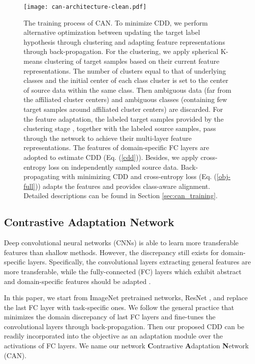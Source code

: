 \documentclass[10pt,twocolumn,letterpaper]{article}
\begin{document}
\begin{figure*}[t]
\begin{center}
\texttt{[image: can-architecture-clean.pdf]}
\end{center}
\vspace{-3mm}
\caption{\label{fig:framework}
The training process of CAN. To minimize CDD, we perform alternative optimization 
between updating the target label hypothesis through clustering and 
adapting feature representations through back-propagation. 
For the clustering, we apply spherical K-means clustering of target samples
based on their current feature representations.
The number of clusters equal to that of underlying classes and 
the initial center of each class cluster is set to the center of source data
within the same class.
Then ambiguous data (\ie far from the affiliated cluster centers) and 
ambiguous classes (\ie containing few target samples around affiliated cluster centers) 
are discarded.
For the feature adaptation, the labeled target samples provided by the clustering stage
, together with the labeled source samples, pass through the network
to achieve their multi-layer feature representations. 
The features of domain-specific FC layers are adopted to estimate CDD (Eq. (\ref{cdd})).
Besides, we apply cross-entropy loss on independently sampled source data.
Back-propagating with minimizing CDD and cross-entropy loss (Eq. (\ref{obj-full})) adapts the
features and provides class-aware alignment.
Detailed descriptions can be found in Section \ref{sec:can_training}.}
\vspace{-3mm}
\end{figure*}
\subsection{Contrastive Adaptation Network}\label{sec:can}
Deep convolutional neural networks (CNNs) is able to learn more transferable features than shallow methods. 
However, the discrepancy still exists for domain-specific layers.
Specifically, the convolutional layers extracting general features are more transferable, 
while the fully-connected (FC) layers which exhibit abstract and domain-specific features should be adapted \cite{long2015learning,long2017deep}. 

In this paper, we start from ImageNet \cite{deng2009imagenet} pretrained networks, \eg ResNet \cite{he2016deep,he2016identity},
and replace the last FC layer with task-specific ones.
We follow the general practice that minimizes the domain discrepancy of last FC layers 
and fine-tunes the convolutional layers through back-propagation. 
Then our proposed CDD can be readily incorporated into the objective as  
an adaptation module
over the activations of FC layers.
We name our network \textbf{C}ontrastive \textbf{A}daptation \textbf{N}etwork (CAN).
\end{document}
